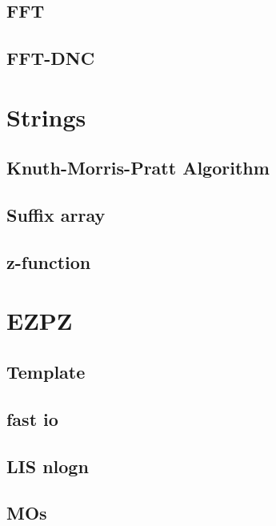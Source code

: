 \subsection{FFT}
\raggedbottom
\hrulefill
\subsection{FFT-DNC}
\raggedbottom
\hrulefill

\section{Strings}
\subsection{Knuth-Morris-Pratt Algorithm}
\raggedbottom
\hrulefill
\subsection{Suffix array}
\raggedbottom
\hrulefill
\subsection{z-function}
\raggedbottom
\hrulefill

\section{EZPZ}
\subsection{Template}
\raggedbottom
\hrulefill
\subsection{fast io}
\raggedbottom
\hrulefill
\subsection{LIS nlogn}
\raggedbottom
\hrulefill
\subsection{MOs}
\raggedbottom
\hrulefill

